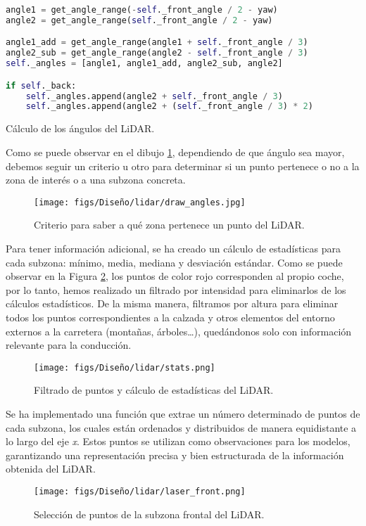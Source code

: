 \begin{code}[h]
\begin{lstlisting}[language=Python]
angle1 = get_angle_range(-self._front_angle / 2 - yaw)
angle2 = get_angle_range(self._front_angle / 2 - yaw)

angle1_add = get_angle_range(angle1 + self._front_angle / 3)
angle2_sub = get_angle_range(angle2 - self._front_angle / 3)        
self._angles = [angle1, angle1_add, angle2_sub, angle2]

if self._back:
	self._angles.append(angle2 + self._front_angle / 3)
	self._angles.append(angle2 + (self._front_angle / 3) * 2)
\end{lstlisting}
\caption[Cálculo de los ángulos de la zona del \ac{LiDAR}]{Cálculo de los ángulos del \ac{LiDAR}.}
\label{cod:angle_lidar}
\end{code}

\newpage

Como se puede observar en el dibujo \ref{fig:dib_angle}, dependiendo de que ángulo sea mayor, debemos seguir un criterio u otro para determinar si un punto pertenece o no a la zona de interés o a una subzona concreta.
\begin{figure}[ht]
  \centering
  \texttt{[image: figs/Diseño/lidar/draw\_angles.jpg]}
  \caption{Criterio para saber a qué zona pertenece un punto del \ac{LiDAR}.}
  \label{fig:dib_angle}
\end{figure}

Para tener información adicional, se ha creado un cálculo de estadísticas para cada subzona: mínimo, media, mediana y desviación estándar. Como se puede observar en la Figura \ref{fig:stats_lidar}, los puntos de color rojo corresponden al propio coche, por lo tanto, hemos realizado un filtrado por intensidad para eliminarlos de los cálculos estadísticos. De la misma manera, filtramos por altura para eliminar todos los puntos correspondientes a la calzada y otros elementos del entorno externos a la carretera (montañas, árboles…), quedándonos solo con información relevante para la conducción.
\begin{figure}[ht]
  \centering
  \texttt{[image: figs/Diseño/lidar/stats.png]}
  \caption{Filtrado de puntos y cálculo de estadísticas del \ac{LiDAR}.}
  \label{fig:stats_lidar}
\end{figure}

\newpage

Se ha implementado una función que extrae un número determinado de puntos de cada subzona, los cuales están ordenados y distribuidos de manera equidistante a lo largo del eje \textit{x}. Estos puntos se utilizan como observaciones para los modelos, garantizando una representación precisa y bien estructurada de la información obtenida del \ac{LiDAR}.
\begin{figure}[ht]
\centering
\texttt{[image: figs/Diseño/lidar/laser\_front.png]}
\caption{Selección de puntos de la subzona frontal del \ac{LiDAR}.}
\label{fig:laser_front}
\end{figure}

